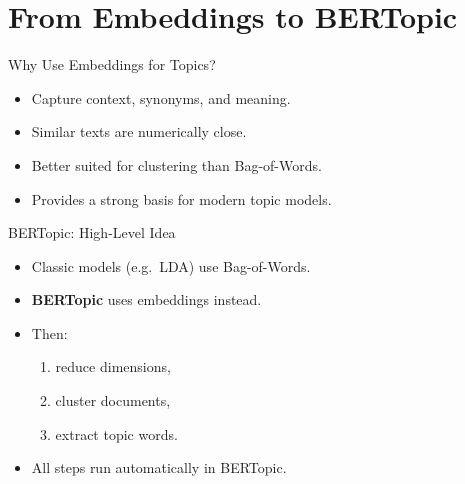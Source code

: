 \documentclass[compress]{beamer}
\begin{document}
\section{From Embeddings to BERTopic}

\begin{frame}{Why Use Embeddings for Topics?}
    \begin{itemize}
        \item Capture context, synonyms, and meaning.
        \item Similar texts are numerically close.
        \item Better suited for clustering than Bag-of-Words.
        \item Provides a strong basis for modern topic models.
    \end{itemize}
\end{frame}


\begin{frame}{BERTopic: High-Level Idea}
    \begin{itemize}
        \item Classic models (e.g.\ LDA) use Bag-of-Words.
        \item \textbf{BERTopic} uses embeddings instead.
        \item Then:
        \begin{enumerate}
            \item reduce dimensions,
            \item cluster documents,
            \item extract topic words.
        \end{enumerate}
        \item All steps run automatically in BERTopic.
    \end{itemize}
\end{frame}

\end{document}
